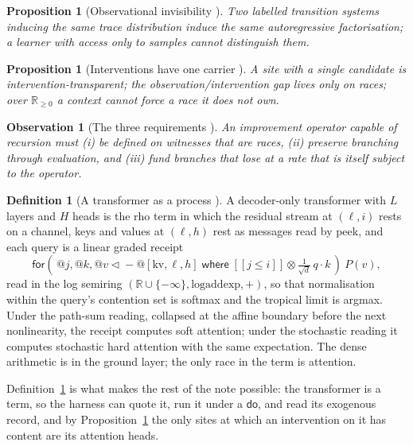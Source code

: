 \documentclass[11pt]{article}
\makeatletter
\theoremstyle{plain}
\newtheorem{proposition}[theorem]{Proposition}
\newtheorem{observation}[theorem]{Observation}
\theoremstyle{definition}
\newtheorem{definition}[theorem]{Definition}
\theoremstyle{remark}
\newcommand{\Rnn}{\mathbb{R}_{\geq 0}}
\newcommand{\crisp}[1]{[\![#1]\!]}
\newcommand{\tensorv}{\otimes}
\newcommand{\dok}{\textsf{do}}
\newcommand{\fork}{\textsf{for}}
\newcommand{\where}{\textsf{where}}
\newcommand{\quo}[1]{@#1}
\makeatother
\begin{document}
\begin{proposition}[Observational invisibility {\cite[Prop.~4.1]{Inhabiting}}]
\label{prop:invisible}
Two labelled transition systems inducing the same trace distribution induce the
same autoregressive factorisation; a learner with access only to samples cannot
distinguish them.
\end{proposition}

\begin{proposition}[Interventions have one carrier {\cite[\S3]{Interventions}}]
\label{prop:carrier}
A site with a single candidate is intervention-transparent; the
observation/intervention gap lives only on races; over $\Rnn$ a context cannot
force a race it does not own.
\end{proposition}

\begin{observation}[The three requirements {\cite[Obs.~5.1]{Inhabiting}}]
\label{obs:rsi}
An improvement operator capable of recursion must (i) be defined on witnesses
that are races, (ii) preserve branching through evaluation, and (iii) fund
branches that lose at a rate that is itself subject to the operator.
\end{observation}

\begin{definition}[A transformer as a process {\cite{TransformerProposal}}]
\label{def:transformer}
A decoder-only transformer with $L$ layers and $H$ heads is the rho term in
which the residual stream at $(\ell, i)$ rests on a channel, keys and values at
$(\ell, h)$ rest as messages read by peek, and each query is a linear graded
receipt
\[
\fork(\,@j, @k, @v \lhd\!\!- \quo{[\mathrm{kv},\ell,h]}
 \;\where\; \crisp{j \leq i} \tensorv \tfrac{1}{\sqrt{d}}\, q\cdot k\,)\ P(v),
\]
read in the log semiring $(\mathbb{R}\cup\{-\infty\}, \mathrm{logaddexp}, +)$,
so that normalisation within the query's contention set is softmax and the
tropical limit is argmax. Under the path-sum reading, collapsed at the affine
boundary before the next nonlinearity, the receipt computes soft attention; under
the stochastic reading it computes stochastic hard attention with the same
expectation. The dense arithmetic is in the ground layer; the only race in the
term is attention.
\end{definition}

Definition~\ref{def:transformer} is what makes the rest of the note possible:
the transformer is a term, so the harness can quote it, run it under a $\dok$,
and read its exogenous record, and by Proposition~\ref{prop:carrier} the only
sites at which an intervention on it has content are its attention heads.
\end{document}
